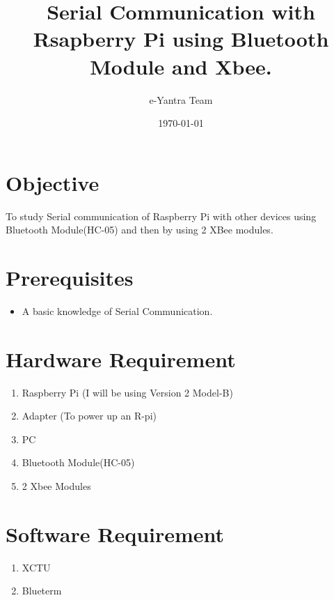 \documentclass[11pt,a4paper]{article}
\title{Serial Communication with Rsapberry Pi using Bluetooth Module and Xbee.}
\author{e-Yantra Team}
\date{\today}
\begin{document}
	\maketitle
	\newpage
	\tableofcontents
	\newpage
	\section{Objective}
	To study Serial communication of Raspberry Pi with other devices using Bluetooth Module(HC-05) and then by using 2 XBee modules.
	\section{Prerequisites}
	\begin{itemize}
		\item A basic knowledge of Serial Communication.
	\end{itemize}
	\section{Hardware Requirement}
	\begin{enumerate}
		\item Raspberry Pi (I will be using Version 2 Model-B)
		\item Adapter (To power up an R-pi)
		\item PC 
		\item Bluetooth Module(HC-05)
		\item 2 Xbee Modules
	\end{enumerate}
	\section{Software Requirement}
	\begin{enumerate}
		\item XCTU 
		\item Blueterm		
	\end{enumerate}
	\newpage
\end{document}

